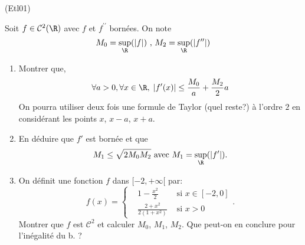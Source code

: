 \begin{tiny}(Etl01)\end{tiny}
Soit $f \in \mathcal{C}^2(\R)$ avec $f$ et $f^{\prime \prime }$ born{\'e}es. 
On note 
\[
 M_{0}=\sup_{\R}(\left| f\right|) \text{ , } M_{2}=\sup_{\R}(\left| f^{\prime\prime }\right| ) 
\]
\begin{enumerate}
 \item Montrer que,
\begin{displaymath}
\forall a>0,\forall x\in \R, \; | f'(x)| \leq \frac{M_{0}}{a}+\frac{M_{2}}{2}a
\end{displaymath}
On pourra utiliser deux fois une formule de Taylor (quel reste?) à l'ordre $2$ en considérant les points $x$, $x-a$, $x+a$.
\item En d{\'e}duire que $f'$ est born{\'e}e et que
\[
M_{1}\leq \sqrt{2M_{0}M_{2}} \text{ avec } M_{1}=\sup_{\R}(\vert f^{\prime }\vert).
\]
\item On définit une fonction $f$ dans $[-2,+\infty[$ par:
\[
 f(x)=
\left\lbrace
\begin{aligned}
 &1-\frac{x^2}{2} &\text{ si } x\in [-2,0]\\
 & \frac{2+x^2}{2(1+x^2)} &\text{ si } x>0
\end{aligned}
\right. . 
\]
Montrer que $f$ est $\mathcal C^2$ et calculer $M_0$, $M_1$, $M_2$. Que peut-on en conclure pour l'inégalité du b. ? 
\end{enumerate}


